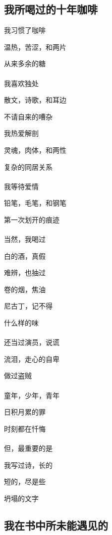 \documentclass[openany,scheme = chinese, linespread = 1.5]{ctexbook}
\begin{document}
\subsection*{我所喝过的十年咖啡}
\begin{center}

我习惯了咖啡

温热，苦涩，和两片

从来多余的糖\\
\ \\
我喜欢独处

散文，诗歌，和耳边

不请自来的嘈杂

我热爱解剖

灵魂，肉体，和两性

复杂的同居关系\\
\ \\
我等待爱情

铅笔，毛笔，和钢笔

第一次划开的痕迹\\
\ \\
当然，我喝过

白的酒，真假

难辨，也抽过

卷的烟，焦油

尼古丁，记不得

什么样的味\\
\ \\
还当过演员，说谎

流泪，走心的自卑

做过盗贼\\
\ \\
童年，少年，青年

日积月累的罪

时刻都在忏悔\\
\ \\
但，最重要的是

我写过诗，长的

短的，尽是些

坍塌的文字
\end{center}

\subsection*{我在书中所未能遇见的}
\end{document}
